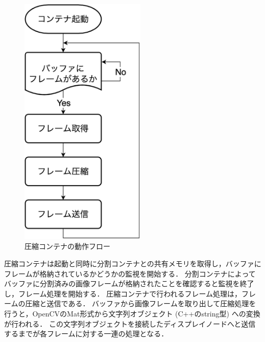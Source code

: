\begin{figure}[H]
    \hspace*{\fill}
    \includegraphics[width=60mm]{./fig/chap3/assyuku_flow.eps}
    \hspace*{\fill}
    \caption{圧縮コンテナの動作フロー}
    \label{compress_container}
\end{figure}

圧縮コンテナは起動と同時に分割コンテナとの共有メモリを取得し，バッファにフレームが格納されているかどうかの監視を開始する．
分割コンテナによってバッファに分割済みの画像フレームが格納されたことを確認すると監視を終了し，フレーム処理を開始する．
圧縮コンテナで行われるフレーム処理は，フレームの圧縮と送信である．
バッファから画像フレームを取り出して圧縮処理を行うと，OpenCVのMat形式から文字列オブジェクト (C++のstring型) への変換が行われる．
この文字列オブジェクトを接続したディスプレイノードへと送信するまでが各フレームに対する一連の処理となる．

